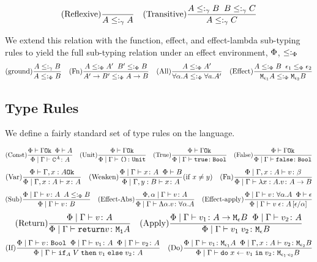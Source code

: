 \documentclass{Report}
\begin{document}
    \[
        \treerule{Reflexive}{}{A \subtype_{\ground} A}
        \quad
        \treerule{Transitive}{A \subtype_{\ground} B \s \s B \subtype_{\ground} C}{A \subtype_{\ground} C}
    \]

    We extend this relation with the function, effect, and effect-lambda sub-typing rules to yield the full sub-typing relation under an effect environment, $\P$, $\subtypep$
\[
    \treerule{ground}{A \subtype_{\ground} B}{A \subtypep B}
    \quad
    \treerule{Fn}{A \subtypep A' \s\s B' \subtypep B }{\fntype{A'}{B'} \subtypep \ab}
    \quad
    \treerule{All}{A\subtypep A'}{\all{\a}{A}\subtypep\all{a}{A'}}
    \quad
    \treerule{Effect}{A\subtypep B\s\s \e_1\subeffectp\e_2}{\M{\e_1}{A}\subtypep\M{\e_2}{B}}
\]


\subsection{Type Rules}
We define a fairly standard set of type rules on the language.

\[
    \treerule{Const}{\oke{\P}{\G}\s\s\wellformed{\P}{A}}{\gpetyperelation{\const{A}}{A}} 
    \quad
    \treerule{Unit}{\oke{\P}{\G}}{\gpetyperelation{\u}{\U}} 
    \quad
    \treerule{True}{\oke{\P}{\G}}{\gpetyperelation{\t}{\B}}
    \quad
    \treerule{False}{\oke{\P}{\G}}{\gpetyperelation{\f}{\B}}
\]
\[
\treerule{Var}{\oke{\P}{\gax}}{\etyperelation{\P}{\gax}{x}{A}}
\quad
\condtreerule{Weaken}{\etyperelation{\P}{\G}{x}{A}\s\s\wellformed{\P}{B}}{\etyperelation{\P}{\gby}{x}{A}}{x \neq y}
\quad
\treerule{Fn}{\etyperelation{\P}{\gax}{v}{\b}}{\etyperelation{\P}{\G}{\lam{x}{A}{v}}{\ab}}
\]
\[
    \treerule{Sub}{\etyperelation{\P}{\G}{v}{A}\s\s A \subtypep B}{\etyperelation{\P}{\G}{v}{B}}
    \quad
    \treerule{Effect-Abs}{\etyperelation{\P,\a}{\G}{v}{A}}{\gpetyperelation{\elam{\a}{v}}{\all{\a}{A}}}
    \quad
    \treerule{Effect-apply}{\gpetyperelation{v}{\all{\a}A}\s\s\wellformed{\P}{\e}}{\gpetyperelation{\eapp{v}{\e}}{A\ssub{\a}{\e}}}
\]
\[
    \treerule{Return}{\gpetyperelation{v}{A}}{\gpetyperelation{\return{v}}{\moa}}
    \quad
    \treerule{Apply}{\gpetyperelation{v_1}{\aeb}\s\s\gpetyperelation{v_2}{A}}{\gpetyperelation{\apply{v_1}{v_2}}{\meb}}
\]
\[
    \treerule{If}{\gpetyperelation{v}{\B} \s\s \gpetyperelation{v_1}{A}\s\s\gpetyperelation{v_2}{A}}{\gpetyperelation{\pifthenelse{A}{V}{v_1}{v_2}}{A}}
    \quad
    \treerule{Do}{\gpetyperelation{v_1}{\M{\e_1}{A}} \s\s \etyperelation{\P}{\gax}{v_2}{\M{\e_2}{B}}}{\gpetyperelation{\doin{x}{v_1}{v_2}}{\M{\e_1 \dot \e_2}{B}}}
\]
\end{document}
